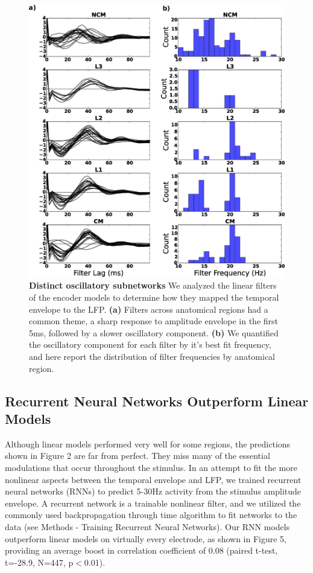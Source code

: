 \begin{figure}
    \caption{\textbf{Distinct oscillatory subnetworks} We analyzed the linear filters of the encoder models to determine how they mapped the temporal envelope to the LFP. \textbf{(a)} Filters across anatomical regions had a common theme, a sharp response to amplitude envelope in the first 5ms, followed by a slower oscillatory component. \textbf{(b)} We quantified the oscillatory component for each filter by it’s best fit frequency, and here report the distribution of filter frequencies by anatomical region.
}
    \centering
    \includegraphics[scale=0.25]{figure_2_4.eps}
\end{figure}

\subsection{Recurrent Neural Networks Outperform Linear Models}

Although linear models performed very well for some regions, the predictions shown in Figure 2 are far from perfect. They miss many of the essential modulations that occur throughout the stimulus. In an attempt to fit the more nonlinear aspects between the temporal envelope and LFP, we trained recurrent neural networks (RNNs) to predict 5-30Hz activity from the stimulus amplitude envelope. A recurrent network is a trainable nonlinear filter, and we utilized the commonly used backpropagation through time algorithm to fit networks to the data (see Methods - Training Recurrent Neural Networks). Our RNN models outperform linear models on virtually every electrode, as shown in Figure 5, providing an average boost in correlation coefficient of 0.08 (paired t-test, t=-28.9, N=447, p$<$0.01).

